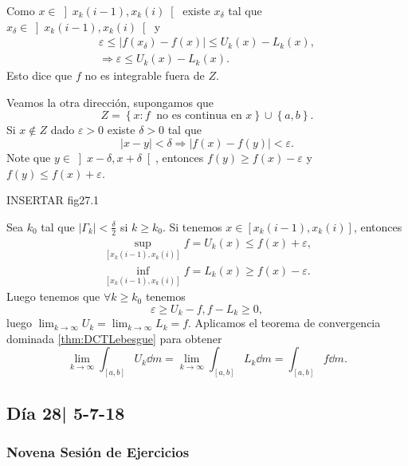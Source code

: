 \documentclass[12pt]{article}
\theoremstyle{plain}
\theoremstyle{definition}
\theoremstyle{remark}
\numberwithin{equation}{section}
\renewcommand{\geq}{\geqslant}      %
\renewcommand{\leq}{\leqslant}      %
\renewcommand{\:}{\colon}           %
\newcommand{\conj}[1]{\left\lbrace#1\right\rbrace}
\newcommand{\bonj}[1]{\left\lbrack#1\right\rbrack}
\newcommand{\obonj}[1]{\left\rbrack#1\right\lbrack}
\begin{document}
\begin{multicols}{2}
\begin{ptcbp}
Como $x\in\obonj{x_k(i-1),x_k(i)}$ existe $x_\delta$ tal que $x_\delta\in\obonj{x_k(i-1),x_k(i)}$ y
\begin{gather*}
  \varepsilon\leq |f(x_\delta)-f(x)|\leq U_k(x)-L_k(x),\\
  \Rightarrow \varepsilon\leq U_k(x)-L_k(x).
\end{gather*}
Esto dice que $f$ no es integrable fuera de $Z$.\par
Veamos la otra dirección, supongamos que
$$Z=\conj{x\: f\ \text{ no es continua en } x}\cup\conj{a,b}.$$
Si $x\not\in Z$ dado $\varepsilon>0$ existe $\delta>0$ tal que
$$|x-y|<\delta\Rightarrow|f(x)-f(y)|<\varepsilon.$$
Note que $y\in\obonj{x-\delta,x+\delta}$, entonces $f(y)\geq f(x)-\varepsilon$ y $f(y)\leq f(x)+\varepsilon$.\par
INSERTAR fig27.1\par
Sea $k_0$ tal que $|\Gamma_k|<\frac{\delta}{2}$ si $k\geq k_0$. Si tenemos $x\in\bonj{x_k(i-1),x_k(i)}$, entonces
\begin{gather*}
  \sup_{\bonj{x_k(i-1),x_k(i)}}f=U_k(x)\leq f(x)+\varepsilon,\\
  \inf_{\bonj{x_k(i-1),x_k(i)}}f=L_k(x)\geq f(x)-\varepsilon.
\end{gather*}
Luego tenemos que $\forall k\geq k_0$ tenemos
$$\varepsilon\geq U_k-f,f-L_k\geq 0,$$
luego $\lim_{k\to\infty}U_k=\lim_{k\to\infty}L_k=f$. Aplicamos el teorema de convergencia dominada \ref{thm:DCTLebesgue} para obtener
$$\lim_{k\to\infty}\int_{\bonj{a,b}}U_k\dd m=\lim_{k\to\infty}\int_{\bonj{a,b}}L_k\dd m=\int_{\bonj{a,b}}f\dd m.$$
\end{ptcbp}

\subsection{Día 28| 5-7-18}
\subsubsection*{Novena Sesión de Ejercicios}


\end{multicols}
\end{document}
